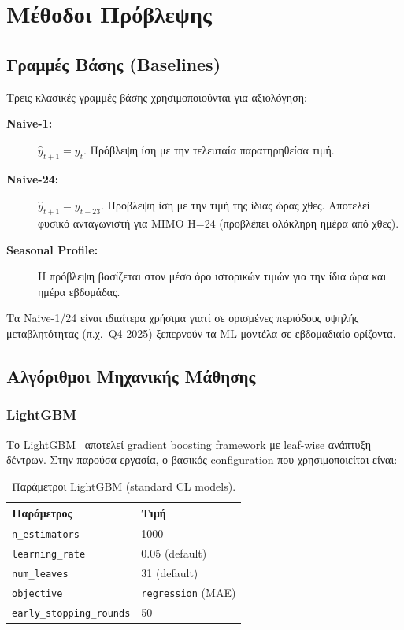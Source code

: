 \chapter{Μέθοδοι Πρόβλεψης}
\label{ch:methods}

\section{Γραμμές Βάσης (Baselines)}
\label{sec:baselines}

Τρεις κλασικές γραμμές βάσης χρησιμοποιούνται για αξιολόγηση:

\begin{description}
    \item[\textbf{Naive-1:}] $\hat{y}_{t+1} = y_t$. Πρόβλεψη ίση με την τελευταία παρατηρηθείσα τιμή.
    \item[\textbf{Naive-24:}] $\hat{y}_{t+1} = y_{t-23}$. Πρόβλεψη ίση με την τιμή της ίδιας ώρας
    χθες. Αποτελεί φυσικό ανταγωνιστή για MIMO H=24 (προβλέπει ολόκληρη ημέρα από χθες).
    \item[\textbf{Seasonal Profile:}] Η πρόβλεψη βασίζεται στον μέσο όρο ιστορικών τιμών για την
    ίδια ώρα και ημέρα εβδομάδας.
\end{description}

Τα Naive-1/24 είναι ιδιαίτερα χρήσιμα γιατί σε ορισμένες περιόδους υψηλής μεταβλητότητας
(π.χ.\ Q4 2025) ξεπερνούν τα ML μοντέλα σε εβδομαδιαίο ορίζοντα.


\section{Αλγόριθμοι Μηχανικής Μάθησης}
\label{sec:ml_algorithms}

\subsection{LightGBM}

Το LightGBM~\cite{ke2017lgbm} αποτελεί gradient boosting framework με leaf-wise ανάπτυξη δέντρων.
Στην παρούσα εργασία, ο βασικός configuration που χρησιμοποιείται είναι:

\begin{table}[H]
\centering
\caption{Παράμετροι LightGBM (standard CL models).}
\label{tab:lgbm_params}
\begin{tabular}{ll}
\toprule
\textbf{Παράμετρος} & \textbf{Τιμή} \\
\midrule
\texttt{n\_estimators} & 1000 \\
\texttt{learning\_rate} & 0.05 (default) \\
\texttt{num\_leaves} & 31 (default) \\
\texttt{objective} & \texttt{regression} (MAE) \\
\texttt{early\_stopping\_rounds} & 50 \\
\bottomrule
\end{tabular}
\end{table}

